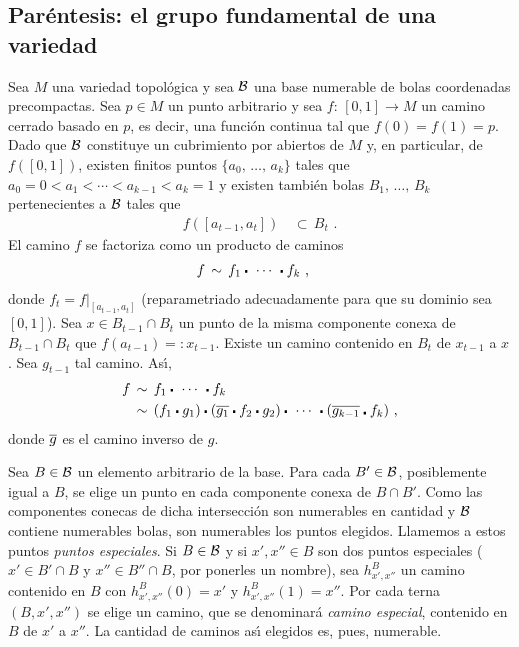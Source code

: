 \subsection{Par\'{e}ntesis: el grupo fundamental de una variedad}
Sea $M$ una variedad topol\'{o}gica y sea $\cal{B}$ una base numerable de
bolas coordenadas precompactas. Sea $p\in M$ un punto arbitrario y sea
$f:\,[0,1]\rightarrow M$ un camino cerrado basado en $p$, es decir, una
funci\'{o}n continua tal que $f(0)=f(1)=p$. Dado que $\cal{B}$ constituye
un cubrimiento por abiertos de $M$ y, en particular, de $f([0,1])$,
existen finitos puntos $\{a_{0},\,\dots,\,a_{k}\}$
tales que $a_{0}=0<a_{1}<\cdots<a_{k-1}<a_{k}=1$ y existen tambi\'{e}n bolas
$B_{1},\,\dots,\,B_{k}$ pertenecientes a $\cal{B}$ tales que
\begin{align*}
	f([a_{t-1},a_{t}]) & \,\subset\,B_{t}
	\text{ .}
\end{align*}
%
El camino $f$ se factoriza como un producto de caminos
\begin{align*}
	f & \,\sim\,f_{1}\sqcdot\,\cdots\,\sqcdot f_{k}
	\text{ ,}
\end{align*}
%
donde $f_{t}=f|_{[a_{t-1},a_{t}]}$ (reparametriado adecuadamente para que su
dominio sea $[0,1]$). Sea $x\in B_{t-1}\cap B_{t}$ un punto de la misma
componente conexa de $B_{t-1}\cap B_{t}$ que $f(a_{t-1})=:x_{t-1}$.
Existe un camino contenido en $B_{t}$ de $x_{t-1}$ a $x$. Sea $g_{t-1}$ tal
camino. As\'{\i},
\begin{align*}
	f & \,\sim\, f_{1}\sqcdot\,\cdots\,\sqcdot f_{k} \\
	& \,\sim\,(f_{1}\sqcdot g_{1})\sqcdot
		(\reverse{g_{1}}\sqcdot f_{2}\sqcdot g_{2})
		\sqcdot\,\cdots\,\sqcdot (\reverse{g_{k-1}}\sqdot f_{k})
	\text{ ,}
\end{align*}
%
donde $\reverse{g}$ es el camino inverso de $g$.

Sea $B\in\cal{B}$ un elemento arbitrario de la base. Para cada $B'\in\cal{B}$,
posiblemente igual a $B$, se elige un punto en cada componente conexa
de $B\cap B'$. Como las componentes conecas de dicha intersecci\'{o}n son
numerables en cantidad y $\cal{B}$ contiene numerables bolas, son numerables
los puntos elegidos. Llamemos a estos puntos \emph{puntos especiales}. Si
$B\in\cal{B}$ y si $x',x''\in B$ son dos puntos especiales ($x'\in B'\cap B$
y $x''\in B''\cap B$, por ponerles un nombre), sea $h_{x',x''}^{B}$ un camino
contenido en $B$ con $h_{x',x''}^{B}(0)=x'$ y $h_{x',x''}^{B}(1)=x''$.
Por cada terna $(B,x',x'')$ se elige un camino, que se denominar\'{a}
\emph{camino especial}, contenido en $B$ de $x'$ a $x''$. La cantidad de
caminos as\'{\i} elegidos es, pues, numerable.

